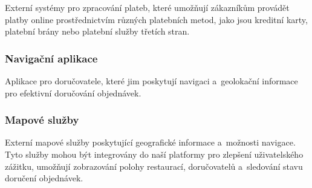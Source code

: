 		Externí systémy pro zpracování plateb, které umožňují zákazníkům provádět platby online prostřednictvím různých platebních metod, jako jsou kreditní karty, platební brány nebo platební služby třetích stran.

        \subsubsection{Navigační aplikace} 
		
		Aplikace pro doručovatele, které jim poskytují navigaci a~geolokační informace pro efektivní doručování objednávek.

        \subsubsection{Mapové služby} 
		
		Externí mapové služby poskytující geografické informace a~možnosti navigace. Tyto služby mohou být integrovány do naší platformy pro zlepšení uživatelského zážitku, umožňují zobrazování polohy restaurací, doručovatelů a~sledování stavu doručení objednávek.

\pagebreak
